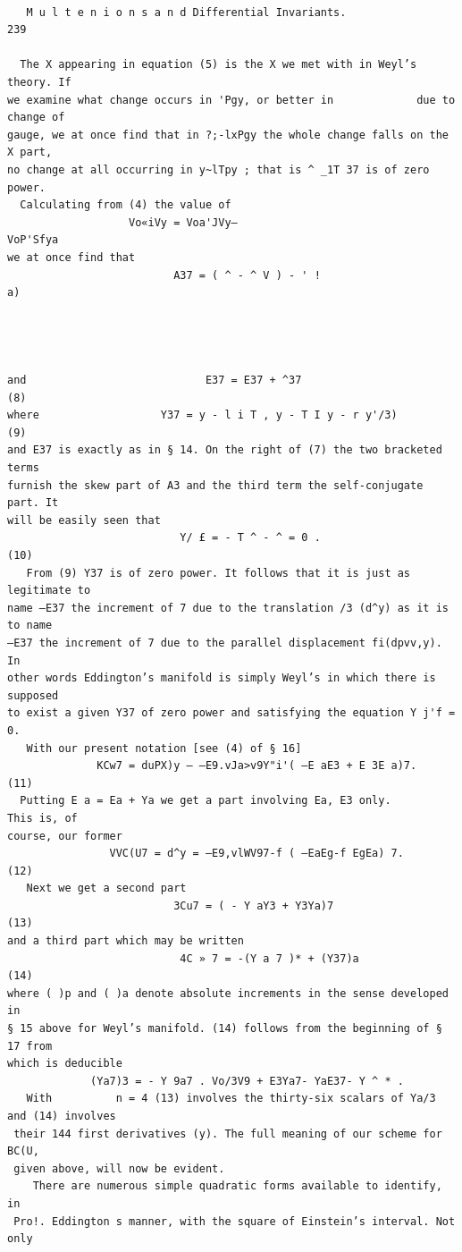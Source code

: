 \documentclass[10pt]{article}
\begin{document}
\clearpage
\begin{verbatim}

   M u l t e n i o n s a n d Differential Invariants.                      239

  The X appearing in equation (5) is the X we met with in Weyl’s theory. If
we examine what change occurs in 'Pgy, or better in             due to change of
gauge, we at once find that in ?;-lxPgy the whole change falls on the X part,
no change at all occurring in y~lTpy ; that is ^ _1T 37 is of zero power.
  Calculating from (4) the value of
                   Vo«iVy = Voa'JVy—                                   VoP'Sfya
we at once find that
                          A37 = ( ^ - ^ V ) - ' !                            a)




and                            E37 = E37 + ^37                               (8)
where                   Y37 = y - l i T , y - T I y - r y'/3)            (9)
and E37 is exactly as in § 14. On the right of (7) the two bracketed terms
furnish the skew part of A3 and the third term the self-conjugate part. It
will be easily seen that
                           Y/ £ = - T ^ - ^ = 0 .                      (10)
   From (9) Y37 is of zero power. It follows that it is just as legitimate to
name —E37 the increment of 7 due to the translation /3 (d^y) as it is to name
—E37 the increment of 7 due to the parallel displacement fi(dpvv,y). In
other words Eddington’s manifold is simply Weyl’s in which there is supposed
to exist a given Y37 of zero power and satisfying the equation Y j'f = 0.
   With our present notation [see (4) of § 16]
              KCw7 = duPX)y — —E9.vJa>v9Y"i'( —E aE3 + E 3E a)7.           (11)
  Putting E a = Ea + Ya we get a part involving Ea, E3 only.        This is, of
course, our former
                VVC(U7 = d^y = —E9,vlWV97-f ( —EaEg-f EgEa) 7.             (12)
   Next we get a second part
                          3Cu7 = ( - Y aY3 + Y3Ya)7                        (13)
and a third part which may be written
                           4C » 7 = -(Y a 7 )* + (Y37)a                    (14)
where ( )p and ( )a denote absolute increments in the sense developed in
§ 15 above for Weyl’s manifold. (14) follows from the beginning of § 17 from
which is deducible
             (Ya7)3 = - Y 9a7 . Vo/3V9 + E3Ya7- YaE37- Y ^ * .
   With          n = 4 (13) involves the thirty-six scalars of Ya/3 and (14) involves
 their 144 first derivatives (y). The full meaning of our scheme for BC(U,
 given above, will now be evident.
    There are numerous simple quadratic forms available to identify, in
 Pro!. Eddington s manner, with the square of Einstein’s interval. Not only


\end{verbatim}
\end{document}

